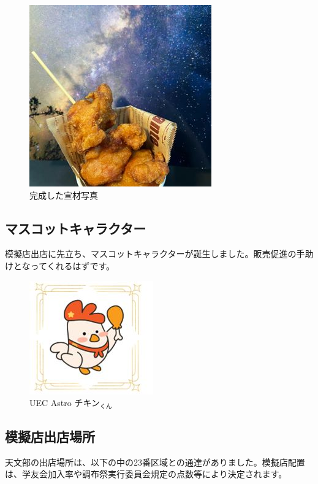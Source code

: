 \documentclass[../super_nova_20yy]{subfiles}
\begin{document}
\begin{figure}[H]
\begin{minipage}[t]{0.4\columnwidth}
    \includegraphics[width=\columnwidth]{画像3.jpg}
    \caption{完成した宣材写真}
    \label{fig:3}
  \end{minipage}
\end{figure}
\subsection{マスコットキャラクター}
模擬店出店に先立ち、マスコットキャラクターが誕生しました。販売促進の手助けとなってくれるはずです。

\begin{figure}[H]
  \centering
  \includegraphics[width=.5\columnwidth]{画像4.jpg}
  \caption{UEC Astro チキン$_\text{くん}$}
  \label{fig:4}
\end{figure}
\subsection{模擬店出店場所}
天文部の出店場所は、以下の中の23番区域との通達がありました。模擬店配置は、学友会加入率や調布祭実行委員会規定の点数等により決定されます。
\end{document}
